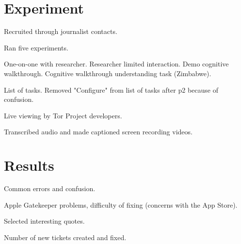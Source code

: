 
\section{Experiment}

Recruited through journalist contacts.

Ran five experiments.

One-on-one with researcher.
Researcher limited interaction.
Demo cognitive walkthrough.
Cognitive walkthrough understanding task (Zimbabwe).

List of tasks.
Removed "Configure" from list of tasks after p2 because of confusion.

Live viewing by Tor Project developers.

Transcribed audio and made captioned screen recording videos.


\section{Results}

Common errors and confusion.

Apple Gatekeeper problems,
difficulty of fixing (concerns with the App Store).

Selected interesting quotes.

Number of new tickets created and fixed.
